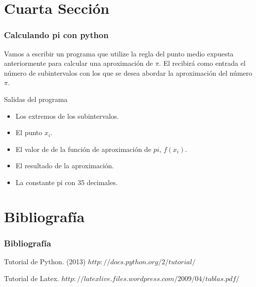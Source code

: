 \documentclass{beamer}
\begin{document}

\section{Cuarta Sección}

\begin{frame}

\frametitle{Calculando pi con python}

Vamos a escribir un programa que utilize la regla del punto medio expuesta anteriormente para calcular una aproximación de $\pi$. El recibirá
como entrada el número de subintervalos con los que se desea abordar la aproximación del número $\pi$.

\begin{block}{Salidas del programa}
  \begin{itemize}
  \item
   Los extremos de los subintervalos.
  \pause

  \item
   El punto $x_i$.
  \pause

  \item
  El valor de de la función de aproximación de $pi$, $f(x_i)$.
  \pause
  
  \item
  El resultado de la aproximación.
  \pause
  
  \item
  La constante pi con 35 decimales.

  \end{itemize}
\end{block}

\end{frame}

\section{Bibliografía}
\begin{frame}
  \frametitle{Bibliografía}

  \begin{thebibliography}{10}

    \beamertemplatebookbibitems
    Tutorial de Python.
    (2013)
    {\small $http://docs.python.org/2/tutorial/$}

    \beamertemplatebookbibitems
    Tutorial de Latex.
    {\small $http://latexlive.files.wordpress.com/2009/04/tablas.pdf/$}
   

  \end{thebibliography}
\end{frame}



\end{document}
